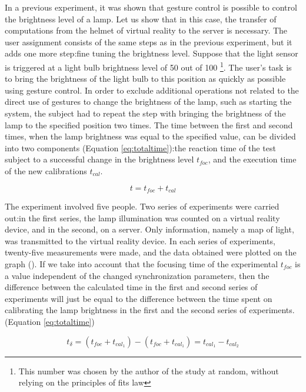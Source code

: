 In a previous experiment, it was shown that gesture control is possible to control the brightness level of a lamp. Let us show that in this case, the transfer of computations from the helmet of virtual reality to the server is necessary. The user assignment consists of the same steps as in the previous experiment, but it adds one more step:fine tuning the brightness level. Suppose that the light sensor is triggered at a light bulb brightness level of 50 out of 100 \footnote{This number was chosen by the author of the study at random, without relying on the principles of fits law}. The user's task is to bring the brightness of the light bulb to this position as quickly as possible using gesture control. In order to exclude additional operations not related to the direct use of gestures to change the brightness of the lamp, such as starting the system, the subject had to repeat the step with bringing the brightness of the lamp to the specified position two times. The time between the first and second times, when the lamp brightness was equal to the specified value, can be divided into two components (Equation \eqref{eq:totaltime}):the reaction time of the test subject to a successful change in the brightness level $ t_{foc} $, and the execution time of the new calibrations $ t_{cal} $.

\begin{equation}
  t = t_{foc} + t_{cal}
  \label{eq:totaltime}
\end{equation}

The experiment involved five people. Two series of experiments were carried out:in the first series, the lamp illumination was counted on a virtual reality device, and in the second, on a server. Only information, namely a map of light, was transmitted to the virtual reality device. In each series of experiments, twenty-five measurements were made, and the data obtained were plotted on the graph (). If we take into account that the focusing time of the experimental $ t_{foc} $ is a value independent of the changed synchronization parameters, then the difference between the calculated time in the first and second series of experiments will just be equal to the difference between the time spent on calibrating the lamp brightness in the first and the second series of experiments. (Equation \eqref{eq:totaltime})

\begin{equation}
  t _{\delta} = (t_{foc} + t_{cal_1}) - (t_{foc} + t_{cal_1}) = t_{cal_1} - t_{cal_2}
  \label{eq:deltatime}
\end{equation}


